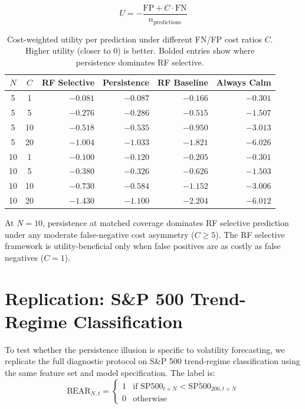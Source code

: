 \documentclass[12pt]{article}
\begin{document}
\begin{equation}
    U = -\frac{\text{FP} + C \cdot \text{FN}}{n_{\text{predictions}}}
    \label{eq:utility}
\end{equation}

\begin{table}[H]
\centering
\caption{Cost-weighted utility per prediction under different FN/FP cost ratios $C$. Higher
utility (closer to 0) is better. Bolded entries show where persistence dominates RF selective.}
\label{tab:utility}
\begin{tabular}{ccrrrr}
\toprule
$N$ & $C$ & RF Selective & Persistence & RF Baseline & Always Calm \\
\midrule
5 &  1 & $-0.081$ & $-0.087$ & $-0.166$ & $-0.301$ \\
5 &  5 & $-0.276$ & $-0.286$ & $-0.515$ & $-1.507$ \\
5 & 10 & $-0.518$ & $-0.535$ & $-0.950$ & $-3.013$ \\
5 & 20 & $-1.004$ & $-1.033$ & $-1.821$ & $-6.026$ \\
\midrule
10 &  1 & $-0.100$ & $-0.120$ & $-0.205$ & $-0.301$ \\
10 &  5 & $-0.380$ & $\mathbf{-0.326}$ & $-0.626$ & $-1.503$ \\
10 & 10 & $-0.730$ & $\mathbf{-0.584}$ & $-1.152$ & $-3.006$ \\
10 & 20 & $-1.430$ & $\mathbf{-1.100}$ & $-2.204$ & $-6.012$ \\
\bottomrule
\end{tabular}
\end{table}

At $N = 10$, persistence at matched coverage dominates RF selective prediction under any moderate
false-negative cost asymmetry ($C \geq 5$). The RF selective framework is utility-beneficial only
when false positives are as costly as false negatives ($C = 1$).

\section{Replication: S\&P 500 Trend-Regime Classification}
\label{sec:replication}

To test whether the persistence illusion is specific to volatility forecasting, we replicate the
full diagnostic protocol on S\&P 500 trend-regime classification using the same feature set and
model specification. The label is:
\begin{equation}
    \text{BEAR}_{N,t} = \begin{cases} 1 & \text{if } \text{SP500}_{t+N} < \overline{\text{SP500}}_{200,t+N} \\ 0 & \text{otherwise} \end{cases}
\end{equation}
\end{document}
